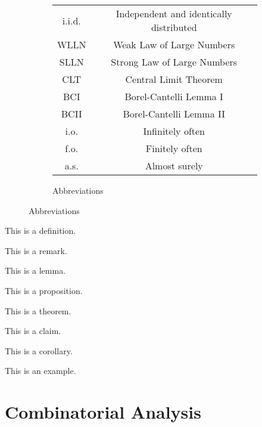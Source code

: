 \documentclass{huhtakm-template-book-v2}
\begin{document}
\begin{figure}[h]
\begin{subfigure}[h]{0.45\textwidth}
\begin{tabular}{cc}
                i.i.d. & Independent and identically distributed\\
                WLLN & Weak Law of Large Numbers\\
                SLLN & Strong Law of Large Numbers\\
                CLT & Central Limit Theorem\\
                BCI & Borel-Cantelli Lemma I\\
                BCII & Borel-Cantelli Lemma II\\
                i.o. & Infinitely often\\
                f.o. & Finitely often\\
                a.s. & Almost surely
            \end{tabular}
            \caption{Abbreviations}
        \end{subfigure}
    \end{figure}
    \begin{defn}
        This is a definition.
    \end{defn}
    \begin{rem}
        This is a remark.
    \end{rem}
    \begin{lem}
        This is a lemma.
    \end{lem}
    \begin{prop}
        This is a proposition.
    \end{prop}
    \begin{thm}
        This is a theorem.
    \end{thm}
    \begin{cla}
        This is a claim.
    \end{cla}
    \begin{cor}
        This is a corollary.
    \end{cor}
    \begin{eg}
        This is an example.
    \end{eg}

\tableofcontents

\chapter{Combinatorial Analysis}
    \label{Chapter 1 (Combinatorial Analysis)}
\end{document}
